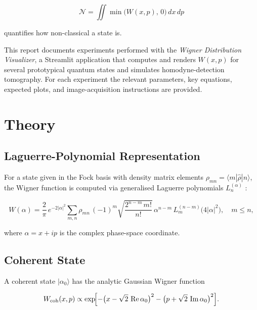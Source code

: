 \documentclass[12pt,a4paper]{article}
\begin{document}
\begin{equation}
  \mathcal{N} = \iint \min\!\bigl(W(x,p),\,0\bigr)\,dx\,dp
  \label{eq:neg_volume}
\end{equation}

quantifies how non-classical a state is.

This report documents experiments performed with the \emph{Wigner Distribution Visualizer}, a Streamlit application that computes and renders $W(x,p)$ for several prototypical quantum states and simulates homodyne-detection tomography. For each experiment the relevant parameters, key equations, expected plots, and image-acquisition instructions are provided.

\section{Theory}

\subsection{Laguerre-Polynomial Representation}

For a state given in the Fock basis with density matrix elements $\rho_{mn}=\langle m|\hat{\rho}|n\rangle$, the Wigner function is computed via generalised Laguerre polynomials $L_n^{(\alpha)}$ \cite{leonhardt1997}:

\begin{equation}
  W(\alpha) = \frac{2}{\pi}\,e^{-2|\alpha|^2}
              \sum_{m,n} \rho_{mn}\,(-1)^m
              \sqrt{\frac{2^{n-m}\,m!}{n!}}\,
              \alpha^{n-m}\,L_m^{(n-m)}\!\bigl(4|\alpha|^2\bigr),
  \quad m \le n,
  \label{eq:laguerre}
\end{equation}

where $\alpha = x + ip$ is the complex phase-space coordinate.

\subsection{Coherent State}

A coherent state $|\alpha_0\rangle$ has the analytic Gaussian Wigner function

\begin{equation}
  W_{\rm coh}(x,p) \propto
  \exp\!\Bigl[-\bigl(x - \sqrt{2}\,\Re\alpha_0\bigr)^2
               -\bigl(p + \sqrt{2}\,\Im\alpha_0\bigr)^2\Bigr].
  \label{eq:wigner_coherent}
\end{equation}
\end{document}
